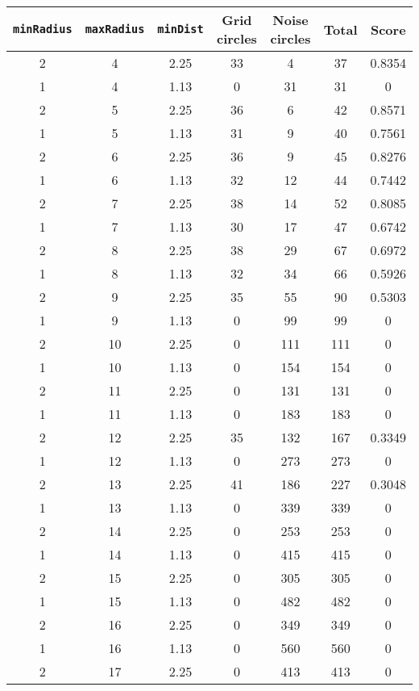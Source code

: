 \documentclass[letterpaper, 12pt]{article}
\begin{document}
\begin{longtable}{|c|c|c|c|c|c|c|}
\hline
\textbf{\texttt{minRadius}} & \textbf{\texttt{maxRadius}} & \textbf{\texttt{minDist}} & \textbf{Grid circles} & \textbf{Noise circles} & \textbf{Total} & \textbf{Score} \\
\hline
2 & 4 & 2.25 & 33 & 4 & 37 & 0.8354 \\
\hline
1 & 4 & 1.13 & 0 & 31 & 31 & 0 \\
\hline
2 & 5 & 2.25 & 36 & 6 & 42 & 0.8571 \\
\hline
1 & 5 & 1.13 & 31 & 9 & 40 & 0.7561 \\
\hline
2 & 6 & 2.25 & 36 & 9 & 45 & 0.8276 \\
\hline
1 & 6 & 1.13 & 32 & 12 & 44 & 0.7442 \\
\hline
2 & 7 & 2.25 & 38 & 14 & 52 & 0.8085 \\
\hline
1 & 7 & 1.13 & 30 & 17 & 47 & 0.6742 \\
\hline
2 & 8 & 2.25 & 38 & 29 & 67 & 0.6972 \\
\hline
1 & 8 & 1.13 & 32 & 34 & 66 & 0.5926 \\
\hline
2 & 9 & 2.25 & 35 & 55 & 90 & 0.5303 \\
\hline
1 & 9 & 1.13 & 0 & 99 & 99 & 0 \\
\hline
2 & 10 & 2.25 & 0 & 111 & 111 & 0 \\
\hline
1 & 10 & 1.13 & 0 & 154 & 154 & 0 \\
\hline
2 & 11 & 2.25 & 0 & 131 & 131 & 0 \\
\hline
1 & 11 & 1.13 & 0 & 183 & 183 & 0 \\
\hline
2 & 12 & 2.25 & 35 & 132 & 167 & 0.3349 \\
\hline
1 & 12 & 1.13 & 0 & 273 & 273 & 0 \\
\hline
2 & 13 & 2.25 & 41 & 186 & 227 & 0.3048 \\
\hline
1 & 13 & 1.13 & 0 & 339 & 339 & 0 \\
\hline
2 & 14 & 2.25 & 0 & 253 & 253 & 0 \\
\hline
1 & 14 & 1.13 & 0 & 415 & 415 & 0 \\
\hline
2 & 15 & 2.25 & 0 & 305 & 305 & 0 \\
\hline
1 & 15 & 1.13 & 0 & 482 & 482 & 0 \\
\hline
2 & 16 & 2.25 & 0 & 349 & 349 & 0 \\
\hline
1 & 16 & 1.13 & 0 & 560 & 560 & 0 \\
\hline
2 & 17 & 2.25 & 0 & 413 & 413 & 0 \\
\hline

\end{longtable}
\end{document}
